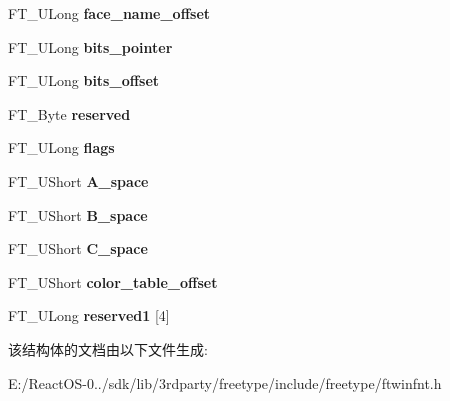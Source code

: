 \begin{DoxyCompactItemize}
F\+T\+\_\+\+U\+Long {\bfseries face\+\_\+name\+\_\+offset}
\item 
\mbox{\label{struct_f_t___win_f_n_t___header_rec___aadce0638c78fbf4ec2566ea9ef49d528}} 
F\+T\+\_\+\+U\+Long {\bfseries bits\+\_\+pointer}
\item 
\mbox{\label{struct_f_t___win_f_n_t___header_rec___abcdf521978a3eb401ed6d1db20e9e16a}} 
F\+T\+\_\+\+U\+Long {\bfseries bits\+\_\+offset}
\item 
\mbox{\label{struct_f_t___win_f_n_t___header_rec___a802cb51af97c1f9c556d1db71e2ea51a}} 
F\+T\+\_\+\+Byte {\bfseries reserved}
\item 
\mbox{\label{struct_f_t___win_f_n_t___header_rec___ac3230b8c51250b5c1e48c8e38c44d6f6}} 
F\+T\+\_\+\+U\+Long {\bfseries flags}
\item 
\mbox{\label{struct_f_t___win_f_n_t___header_rec___ad97f5f84ac213c1fb59ceeafc689f381}} 
F\+T\+\_\+\+U\+Short {\bfseries A\+\_\+space}
\item 
\mbox{\label{struct_f_t___win_f_n_t___header_rec___aabd41a485124b6c4220fc4622525608e}} 
F\+T\+\_\+\+U\+Short {\bfseries B\+\_\+space}
\item 
\mbox{\label{struct_f_t___win_f_n_t___header_rec___a1173b4d5c809db01edf4ff2185e1d43b}} 
F\+T\+\_\+\+U\+Short {\bfseries C\+\_\+space}
\item 
\mbox{\label{struct_f_t___win_f_n_t___header_rec___a83fa51bfd7fe814f8264416204701c60}} 
F\+T\+\_\+\+U\+Short {\bfseries color\+\_\+table\+\_\+offset}
\item 
\mbox{\label{struct_f_t___win_f_n_t___header_rec___af01de9742608fb7a2a603d062f3783e3}} 
F\+T\+\_\+\+U\+Long {\bfseries reserved1} \mbox{[}4\mbox{]}
\end{DoxyCompactItemize}


该结构体的文档由以下文件生成\+:\begin{DoxyCompactItemize}
\item 
E\+:/\+React\+O\+S-\/0../sdk/lib/3rdparty/freetype/include/freetype/ftwinfnt.\+h\end{DoxyCompactItemize}
